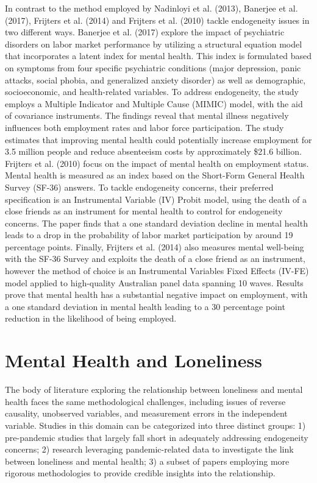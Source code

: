     In contrast to the method employed by Nadinloyi et al. (2013), Banerjee et al. (2017), Frijters et al. (2014) and Frijters et al. (2010) tackle endogeneity issues in two different ways. Banerjee et al. (2017) explore the impact of psychiatric disorders on labor market performance by utilizing a structural equation model that incorporates a latent index for mental health. This index is formulated based on symptoms from four specific psychiatric conditions (major depression, panic attacks, social phobia, and generalized anxiety disorder) as well as demographic, socioeconomic, and health-related variables. To address endogeneity, the study employs a Multiple Indicator and Multiple Cause (MIMIC) model, with the aid of covariance instruments. The findings reveal that mental illness negatively influences both employment rates and labor force participation. The study estimates that improving mental health could potentially increase employment for 3.5 million people and reduce absenteeism costs by approximately \$21.6 billion.
    Frijters et al. (2010) focus on the impact of mental health on employment status. Mental health is measured as an index based on the Short-Form General Health Survey (SF-36) answers. To tackle endogeneity concerns, their preferred specification is an Instrumental Variable (IV) Probit model, using the death of a close friends as an instrument for mental health to control for endogeneity concerns. The paper finds that a one standard deviation decline in mental health leads to a drop in the probability of labor market participation by around 19 percentage points. 
    Finally, Frijters et al. (2014) also measures mental well-being with the SF-36 Survey and exploits the death of a close friend as an instrument, however the method of choice is an Instrumental Variables Fixed Effects (IV-FE) model applied to high-quality Australian panel data spanning 10 waves. Results prove that mental health has a substantial negative impact on employment, with a one standard deviation in mental health leading to a 30 percentage point reduction in the likelihood of being employed. 


\section{Mental Health and Loneliness}
    The body of literature exploring the relationship between loneliness and mental health faces the same methodological challenges, including issues of reverse causality, unobserved variables, and measurement errors in the independent variable. Studies in this domain can be categorized into three distinct groups: 
    1) pre-pandemic studies that largely fall short in adequately addressing endogeneity concerns; 
    2) research leveraging pandemic-related data to investigate the link between loneliness and mental health;
    3) a subset of papers employing more rigorous methodologies to provide credible insights into the relationship.

